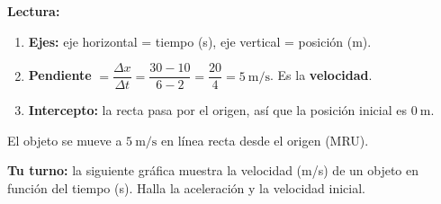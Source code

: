\documentclass[12pt, letterpaper]{article}
\begin{document}
\begin{cuadrosolucion}
  \textbf{Lectura:}
  \begin{enumerate}[leftmargin=*]
    \item \textbf{Ejes:} eje horizontal = tiempo (s), eje vertical = posición (m). \checkmark
    \item \textbf{Pendiente} $= \dfrac{\Delta x}{\Delta t} = \dfrac{30-10}{6-2} = \dfrac{20}{4} = 5\ \text{m/s}$. Es la \textbf{velocidad}.
    \item \textbf{Intercepto:} la recta pasa por el origen, así que la posición inicial es $0\ \text{m}$.
  \end{enumerate}
  El objeto se mueve a $5\ \text{m/s}$ en línea recta desde el origen (MRU).
\end{cuadrosolucion}

\vspace{8pt}
\noindent\textbf{Tu turno:} la siguiente gráfica muestra la velocidad (m/s) de un objeto en función del tiempo (s). Halla la aceleración y la velocidad inicial.
\end{document}
